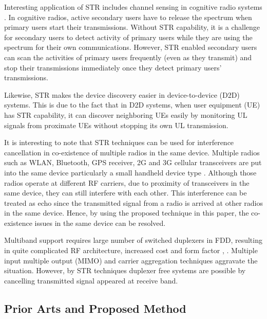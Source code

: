 \documentclass[twocolumn]{IEEEtran}
\begin{document}
Interesting application of STR includes channel sensing in cognitive
radio systems \cite{stanford}. In cognitive radios, active secondary
users have to release the spectrum when primary users start their
transmissions. Without STR capability, it is a challenge for
secondary users to detect activity of primary users while they are
using the spectrum for their own communications. However, STR
enabled secondary users can scan the activities of primary users
frequently (even as they transmit) and stop their transmissions
immediately once they detect primary users' transmissions.

Likewise, STR makes the device discovery easier in device-to-device
(D2D) systems. This is due to the fact that in D2D systems, when
user equipment (UE) has STR capability, it can discover neighboring
UEs easily by monitoring UL signals from proximate UEs without
stopping its own UL transmission.

It is interesting to note that STR techniques can be used for
interference cancellation in co-existence of multiple radios in the
same device. Multiple radios such as WLAN, Bluetooth, GPS receiver,
2G and 3G cellular transceivers are put into the same device
particularly a small handheld device type \cite{mac3}. Although
those radios operate at different RF carriers, due to proximity of
transceivers in the same device, they can still interfere with each
other. This interference can be treated as echo since the
transmitted signal from a radio is arrived at other radios in the
same device. Hence, by using the proposed technique in this paper,
the co-existence issues in the same device can be resolved.

Multiband support requires large number of switched duplexers in
FDD, resulting in quite complicated RF architecture, increased cost
and form factor \cite{str1998}, \cite{dfs1}. Multiple input multiple
output (MIMO) and carrier aggregation techniques aggravate the
situation. However, by STR techniques duplexer free systems are
possible by cancelling transmitted signal appeared at receive band.


\subsection{Prior Arts and Proposed Method}
\end{document}
